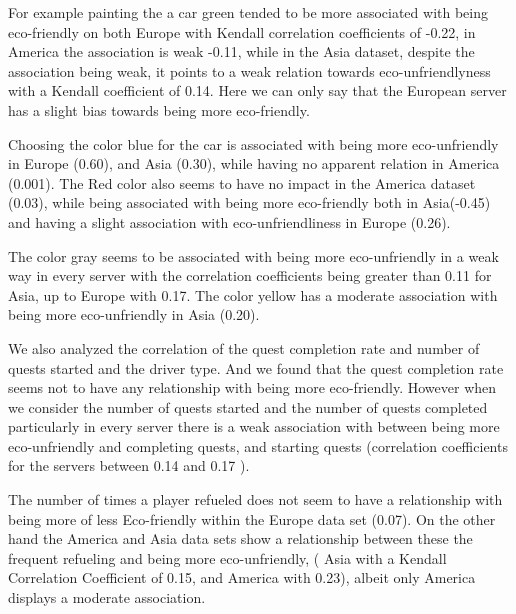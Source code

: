 \documentclass[preprint,authoryear,12pt]{elsarticle}
\begin{document}
For example painting the a car green tended to be more associated with being eco-friendly on both Europe with Kendall correlation coefficients of -0.22, in America the association is weak -0.11, while in the Asia dataset, despite the association being weak, it points to a weak relation towards eco-unfriendlyness with a Kendall coefficient of 0.14. Here we can only say that the European server has a slight bias towards being more eco-friendly.

Choosing the color blue for the car is associated with being more eco-unfriendly in Europe (0.60), and Asia (0.30), while having no apparent relation in America (0.001).
The Red color also seems to have no impact in the America dataset (0.03), while being associated with being more eco-friendly both in Asia(-0.45) and having a slight association with eco-unfriendliness in Europe (0.26).

The color gray seems to be associated with being more eco-unfriendly in a weak way in every server with the correlation coefficients being greater than 0.11 for Asia, up to Europe with 0.17. The color yellow has a moderate association with being more eco-unfriendly in Asia (0.20).

%


We also analyzed the correlation of the quest completion rate and number of quests started and the driver type. And we found that the quest completion rate seems not to have any relationship with being more eco-friendly.
However when we consider the number of quests started and the number of quests completed
particularly in every server there is a weak association with between being more eco-unfriendly and completing quests, and starting quests (correlation coefficients for the servers between 0.14 and 0.17 ).


The number of times a player refueled does not seem to have a relationship with being more of less Eco-friendly within the Europe data set (0.07). On the other hand the America and Asia data sets show a relationship between these the frequent refueling and being more eco-unfriendly, ( Asia with a Kendall Correlation Coefficient of 0.15, and America with 0.23), albeit only America displays a moderate association.
\end{document}
